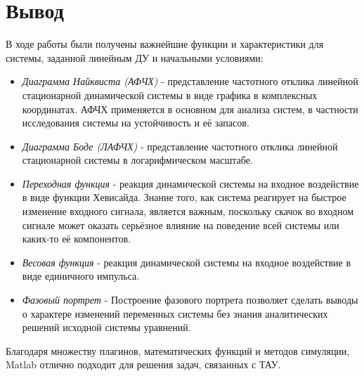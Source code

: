 \documentclass[14pt,a4paper,report]{report}
\begin{document}




\section{Вывод}

В ходе работы были получены важнейшие функции и характеристики для системы, заданной линейным ДУ и начальными условиями:

\begin{itemize}
	\item \emph{Диаграмма Найквиста (АФЧХ)} - представление частотного отклика линейной стационарной динамической системы в виде графика в комплексных координатах. АФЧХ применяется в основном для анализа систем, в частности исследования системы на устойчивость и её запасов.
	\item \emph{Диаграмма Боде (ЛАФЧХ)} - представление частотного отклика линейной стационарной системы в логарифмическом масштабе.
	\item \emph{Переходная функция} - реакция динамической системы на входное воздействие в виде функции Хевисайда. Знание того, как система реагирует на быстрое изменение входного сигнала, является важным, поскольку скачок во входном сигнале может оказать серьёзное влияние на поведение всей системы или каких-то её компонентов.
	\item \emph{Весовая функция} - реакция динамической системы на входное воздействие в виде единичного импульса. 
	\item \emph{Фазовый портрет} - Построение фазового портрета позволяет сделать выводы о характере изменений переменных системы без знания аналитических решений исходной системы уравнений.
\end{itemize}

Благодаря множеству плагинов, математических функций и методов симуляции, Matlab отлично подходит для решения задач, связанных с ТАУ.
\end{document}
